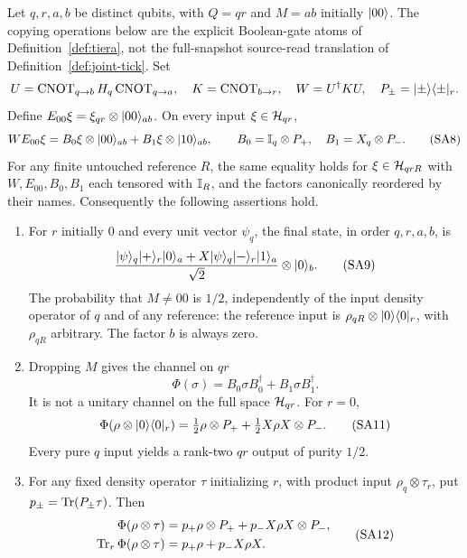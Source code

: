 \begin{theorem}\label{thm:sA-four}
Let $q,r,a,b$ be distinct qubits, with $Q=qr$ and $M=ab$ initially
$\lvert 00\rangle$. The copying operations below are the explicit Boolean-gate
atoms of Definition~\ref{def:tiera}, not the full-snapshot source-read
translation of Definition~\ref{def:joint-tick}. Set
\[
 U=\operatorname{CNOT}_{q\to b}H_q\operatorname{CNOT}_{q\to a},
 \quad K=\operatorname{CNOT}_{b\to r},\quad W=U^\dagger KU,
 \quad P_\pm=\lvert \pm\rangle\langle \pm\rvert_r.
\]
Define $E_{00}\xi=\xi_{qr}\otimes\lvert 00\rangle_{ab}$. On every input
$\xi\in\mathcal{H}_{qr}$,
\[
 WE_{00}\xi=B_0\xi\otimes\lvert 00\rangle_{ab}
             +B_1\xi\otimes\lvert 10\rangle_{ab},\qquad
 B_0=\mathbb{I}_q\otimes P_+,\quad B_1=X_q\otimes P_-.         \tag{SA8}
\]
For any finite untouched reference $R$, the same equality holds for
$\xi\in\mathcal{H}_{qrR}$ with $W,E_{00},B_0,B_1$ each tensored with
$\mathbb{I}_R$, and the factors canonically reordered by their names.
Consequently the following assertions hold.
\begin{enumerate}
 \item For $r$ initially $0$ and every unit vector $\psi_q$, the final
 state, in order $q,r,a,b$, is
 \[
  \frac{\lvert \psi\rangle_q\lvert +\rangle_r\lvert 0\rangle_a+
              X\lvert \psi\rangle_q\lvert -\rangle_r\lvert 1\rangle_a}{\sqrt2}
          \otimes\lvert 0\rangle_b.                              \tag{SA9}
 \]
 The probability that $M\ne00$ is $1/2$, independently of the input
 density operator of $q$ and of any reference: the reference input
 is $\rho_{qR}\otimes\lvert 0\rangle\langle 0\rvert_r$, with $\rho_{qR}$ arbitrary.
 The factor $b$ is always zero.
 \item Dropping $M$ gives the channel on $qr$
 \[
  \Phi(\sigma)=B_0\sigma B_0^\dagger+B_1\sigma B_1^\dagger.
                                                               \tag{SA10}
 \]
 It is not a unitary channel on the full space $\mathcal{H}_{qr}$. For $r=0$,
 \[
  \Phi(\rho\otimes\lvert 0\rangle\langle 0\rvert_r)
   =\tfrac12\rho\otimes P_++\tfrac12X\rho X\otimes P_-.
                                                               \tag{SA11}
 \]
 Every pure $q$ input yields a rank-two $qr$ output of purity $1/2$.
 \item For any fixed density operator $\tau$ initializing $r$, with
 product input $\rho_q\otimes\tau_r$, put
 $p_\pm=\operatorname{Tr}(P_\pm\tau)$. Then
 \[
 \begin{split}
  \Phi(\rho\otimes\tau)&=p_+\rho\otimes P_+
                         +p_-X\rho X\otimes P_-,\\
  \operatorname{Tr}_r\Phi(\rho\otimes\tau)&=p_+\rho+p_-X\rho X.
 \end{split}                                                  \tag{SA12}
\]
\end{enumerate}
\end{theorem}
